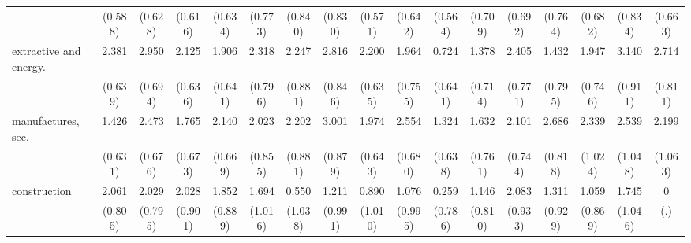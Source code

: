 {\begin{tabular}{l*{16}{c}}
                    &     (0.588)         &     (0.628)         &     (0.616)         &     (0.634)         &     (0.773)         &     (0.840)         &     (0.830)         &     (0.571)         &     (0.642)         &     (0.564)         &     (0.709)         &     (0.692)         &     (0.764)         &     (0.682)         &     (0.834)         &     (0.663)         \\
[1em]
extractive and energy.&       2.381\sym{***}&       2.950\sym{***}&       2.125\sym{***}&       1.906\sym{**} &       2.318\sym{**} &       2.247\sym{*}  &       2.816\sym{***}&       2.200\sym{***}&       1.964\sym{**} &       0.724         &       1.378         &       2.405\sym{**} &       1.432         &       1.947\sym{**} &       3.140\sym{***}&       2.714\sym{***}\\
                    &     (0.639)         &     (0.694)         &     (0.636)         &     (0.641)         &     (0.796)         &     (0.881)         &     (0.846)         &     (0.635)         &     (0.755)         &     (0.641)         &     (0.714)         &     (0.771)         &     (0.795)         &     (0.746)         &     (0.911)         &     (0.811)         \\
[1em]
manufactures, sec.  &       1.426\sym{*}  &       2.473\sym{***}&       1.765\sym{**} &       2.140\sym{**} &       2.023\sym{*}  &       2.202\sym{*}  &       3.001\sym{***}&       1.974\sym{**} &       2.554\sym{***}&       1.324\sym{*}  &       1.632\sym{*}  &       2.101\sym{**} &       2.686\sym{**} &       2.339\sym{*}  &       2.539\sym{*}  &       2.199\sym{*}  \\
                    &     (0.631)         &     (0.676)         &     (0.673)         &     (0.669)         &     (0.855)         &     (0.881)         &     (0.879)         &     (0.643)         &     (0.680)         &     (0.638)         &     (0.761)         &     (0.744)         &     (0.818)         &     (1.024)         &     (1.048)         &     (1.063)         \\
[1em]
construction        &       2.061\sym{*}  &       2.029\sym{*}  &       2.028\sym{*}  &       1.852\sym{*}  &       1.694         &       0.550         &       1.211         &       0.890         &       1.076         &       0.259         &       1.146         &       2.083\sym{*}  &       1.311         &       1.059         &       1.745         &           0         \\
                    &     (0.805)         &     (0.795)         &     (0.901)         &     (0.889)         &     (1.016)         &     (1.038)         &     (0.991)         &     (1.010)         &     (0.995)         &     (0.786)         &     (0.810)         &     (0.933)         &     (0.929)         &     (0.869)         &     (1.046)         &         (.)         \\

\end{tabular}}
